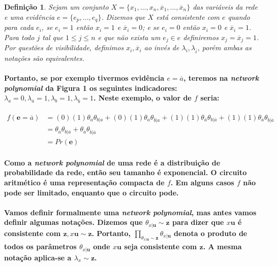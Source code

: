 \documentclass[a4paper,10pt]{article}
\theoremstyle{plain}
\newtheorem*{spn-def}{Definição}
\begin{document}
\begin{spn-def} Sejam um conjunto $X=\{x_1,...,x_n,\overline{x}_1,...,\overline{x}_n\}$ das 
variáveis da rede e uma evidência $e=\{e_p,...,e_q\}$. Dizemos que $X$ está consistente com $e$ 
quando para cada $e_i$, se $e_i=1$ então $x_i=1$ e $\overline{x}_i=0$; e se $e_i=0$ então $x_i=0$ 
e $\overline{x}_i=1$. Para todo $j$ tal que $1\leq{j}\leq{n}$ e que não exista um $e_j \in e$
definiremos $x_j=\overline{x}_j=1$. Por questões de visibilidade, definimos $x_i, \overline{x}_i$
ao invés de $\lambda_{i}, \lambda_{\overline{i}}$, porém ambas as notações são equivalentes.
\end{spn-def}

\paragraph{
  Portanto, se por exemplo tivermos evidência $e=\overline{a}$, teremos na \textit{network 
polynomial} da Figura 1 os seguintes indicadores: $\lambda_{a}=0, \lambda_{\overline{a}}=1,
\lambda_{b}=1, \lambda_{\overline{b}}=1$. Neste exemplo, o valor de $f$ seria:
}

\begin{equation}
\begin{split}
f(\textbf{e}=\overline{a}) & = (0)(1)\theta_{a}\theta_{b|a} + (0)(1)\theta_{a}\theta_{\overline{b}|a} +
  (1)(1)\theta_{\overline{a}}\theta_{b|\overline{a}} + 
  (1)(1)\theta_{\overline{a}}\theta_{\overline{b}|\overline{a}} \\
& = \theta_{\overline{a}}\theta_{b|\overline{a}} + \theta_{\overline{a}}\theta_{\overline{b}|\overline{a}} \\
& = Pr(\textbf{e})
\end{split}
\end{equation}

\paragraph{
  Como a \textit{network polynomial} de uma rede é a distribuição de probabilidade da rede, então
seu tamanho é exponencial. O circuito aritmético é uma representação compacta de $f$. Em alguns
casos $f$ não pode ser limitado, enquanto que o circuito pode.
}

\paragraph{
  Vamos definir formalmente uma \textit{network polynomial}, mas antes vamos definir algumas
notações. Dizemos que $\theta_{x|\textbf{u}} \sim \textbf{z}$ para dizer que $x\textbf{u}$ é
consistente com $\textbf{z}, x\textbf{u} \sim \textbf{z}$. Portanto, 
$\prod_{\theta_{x|\textbf{u}} \sim \textbf{z}} \theta_{x|\textbf{u}}$ denota o produto de todos
os parâmetros $\theta_{x|\textbf{u}}$ onde $x\textbf{u}$ seja consistente com $\textbf{z}$. A mesma
notação aplica-se a $\lambda_x \sim \textbf{z}$.
}
\end{document}
